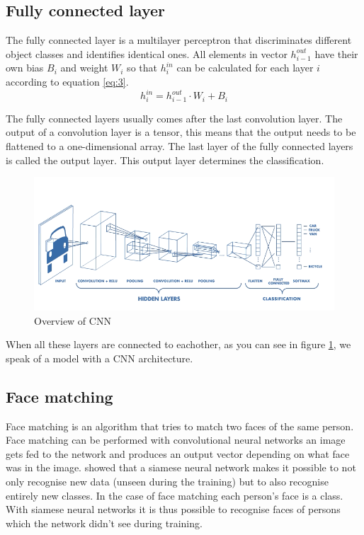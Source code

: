 \subsection{Fully connected layer}
The fully connected layer is a multilayer perceptron that discriminates different object classes and identifies identical ones. All elements in vector $h_{i-1}^{out}$ have their own bias $B_i$ and weight $W_i$ so that $h_i^{in}$ can be calculated for each layer $i$ according to equation \ref{eq:3}.
\begin{equation} \label{eq:3}
  h_i^{in} = h_{i-1}^{out} \cdot W_i + B_i
\end{equation}

The fully connected layers usually comes after the last convolution layer. The output of a convolution layer is a tensor, this means that the output needs to be flattened to a one-dimensional array. The last layer of the fully connected layers is called the output layer. This output layer determines the classification.

\begin{figure}[H]
  \includegraphics[width=\linewidth]{fig/cnn.png}
  \caption{Overview of CNN}
  \label{fig:cnn}
\end{figure}

When all these layers are connected to eachother, as you can see in figure \ref{fig:cnn}, we speak of a model with a CNN architecture.

\subsection{Face matching}
Face matching is an algorithm that tries to match two faces of the same person. Face matching can be performed with convolutional neural networks an image gets fed to the network and produces an output vector depending on what face was in the image. \cite{koch2015siamese} showed that a siamese neural network makes it possible to not only recognise new data (unseen during the training) but to also recognise entirely new classes. In the case of face matching each person's face is a class. With siamese neural networks it is thus possible to recognise faces of persons which the network didn't see during training.

